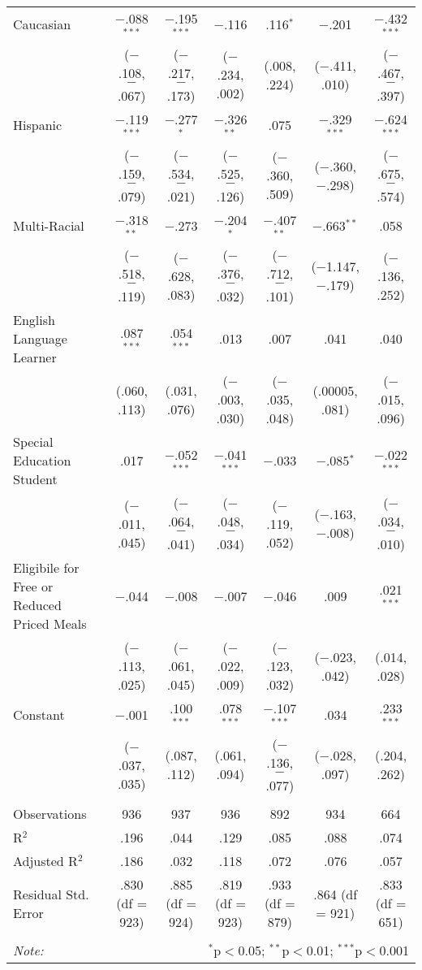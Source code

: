 \begin{table}[!htbp]
\begin{tabular}{@{\extracolsep{5pt}}lcccccc}
  Caucasian & $-$.088$^{***}$ & $-$.195$^{***}$ & $-$.116 & .116$^{*}$ & $-$.201 & $-$.432$^{***}$ \\ 
  & ($-$.108, $-$.067) & ($-$.217, $-$.173) & ($-$.234, .002) & (.008, .224) & ($-$.411, .010) & ($-$.467, $-$.397) \\ 
  Hispanic & $-$.119$^{***}$ & $-$.277$^{*}$ & $-$.326$^{**}$ & .075 & $-$.329$^{***}$ & $-$.624$^{***}$ \\ 
  & ($-$.159, $-$.079) & ($-$.534, $-$.021) & ($-$.525, $-$.126) & ($-$.360, .509) & ($-$.360, $-$.298) & ($-$.675, $-$.574) \\ 
  Multi-Racial & $-$.318$^{**}$ & $-$.273 & $-$.204$^{*}$ & $-$.407$^{**}$ & $-$.663$^{**}$ & .058 \\ 
  & ($-$.518, $-$.119) & ($-$.628, .083) & ($-$.376, $-$.032) & ($-$.712, $-$.101) & ($-$1.147, $-$.179) & ($-$.136, .252) \\ 
  English Language Learner & .087$^{***}$ & .054$^{***}$ & .013 & .007 & .041 & .040 \\ 
  & (.060, .113) & (.031, .076) & ($-$.003, .030) & ($-$.035, .048) & (.00005, .081) & ($-$.015, .096) \\ 
  Special Education Student & .017 & $-$.052$^{***}$ & $-$.041$^{***}$ & $-$.033 & $-$.085$^{*}$ & $-$.022$^{***}$ \\ 
  & ($-$.011, .045) & ($-$.064, $-$.041) & ($-$.048, $-$.034) & ($-$.119, .052) & ($-$.163, $-$.008) & ($-$.034, $-$.010) \\ 
  Eligibile for Free or Reduced Priced Meals & $-$.044 & $-$.008 & $-$.007 & $-$.046 & .009 & .021$^{***}$ \\ 
  & ($-$.113, .025) & ($-$.061, .045) & ($-$.022, .009) & ($-$.123, .032) & ($-$.023, .042) & (.014, .028) \\ 
  Constant & $-$.001 & .100$^{***}$ & .078$^{***}$ & $-$.107$^{***}$ & .034 & .233$^{***}$ \\ 
  & ($-$.037, .035) & (.087, .112) & (.061, .094) & ($-$.136, $-$.077) & ($-$.028, .097) & (.204, .262) \\ 
 \hline \\[-1.8ex] 
Observations & 936 & 937 & 936 & 892 & 934 & 664 \\ 
R$^{2}$ & .196 & .044 & .129 & .085 & .088 & .074 \\ 
Adjusted R$^{2}$ & .186 & .032 & .118 & .072 & .076 & .057 \\ 
Residual Std. Error & .830 (df = 923) & .885 (df = 924) & .819 (df = 923) & .933 (df = 879) & .864 (df = 921) & .833 (df = 651) \\ 
\hline \\[-1.8ex] 
\textit{Note:}  & \multicolumn{6}{r}{$^{*}$p$<$0.05; $^{**}$p$<$0.01; $^{***}$p$<$0.001} \\ 
\end{tabular} 
\end{table} 

